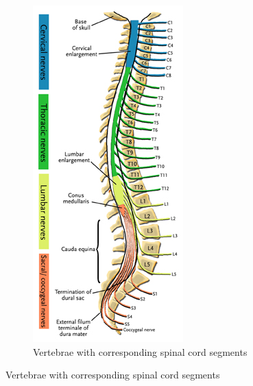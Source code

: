 \documentclass[
  12pt,
]{memoir}
\begin{document}
\begin{figure}[h!]
\begin{subfigure}[b]{.4\textwidth}
        \includegraphics[width=\textwidth]{../assets/med/cauda-2.jpg}
        \caption{Vertebrae with corresponding spinal cord segments}
    \end{subfigure}
\end{figure}
\end{document}
